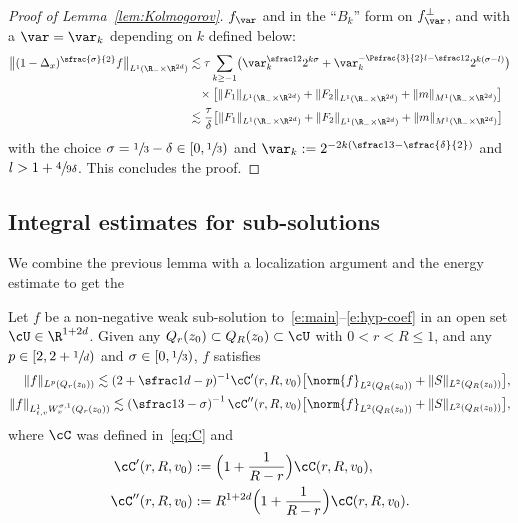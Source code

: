 \begin{proof}[Proof of Lemma~\ref{lem:Kolmogorov}]
$f_\var$ and in the ``$B_k$'' form on $f_\var^\bot$, and with
a $\var=\var_k$ depending on $k$ defined below:
\begin{align*}
\bigl\| (1-\Delta_x)^{\sfrac{\sigma}{2}} f \bigr\|_{L^1(\R_-
\times \R^{2d})}
& \lesssim \tau \sum_{k \ge -1} \bigl( \var_k
^{\sfrac12} 2^{k\sigma} + \var_k^{-\Psfrac{3}{2}l -\sfrac12}
2^{k(\sigma-l)} \bigr) \\
&\hspace*{3mm}
\times \bigl[ \| F_1 \|_{L^1(\R_- \times \R^{2d})}
+ \left\| F_2 \right\|_{L^1(\R_- \times \R^{2d})}
+ \| m \|_{M^1(\R_- \times \R^{2d})} \bigr]\\
& \lesssim
\frac{\tau}{\delta} \bigl[ \| F_1 \|_{L^1(\R_- \times \R^{2d})}
+ \left\| F_2 \right\|_{L^1(\R_- \times \R^{2d})}
+ \| m \|_{M^1(\R_- \times \R^{2d})} \bigr]
\end{align*}
with the choice $\sigma = \sfrac13 - \delta \in [0,\sfrac13)$ and
$\var_k := 2^{-2k(\sfrac13-\sfrac{\delta}{2})}$ and
$l> 1+\sfrac{4}{9\delta}$. This concludes the proof.
\Changelback
\end{proof}

\subsection{Integral estimates for sub-solutions}

We combine the previous lemma with a localization argument and
the energy estimate to get the
\begin{proposition}
\label{prop:Gain sol}
Let $f$ be a non-negative weak sub-solution
to~\eqref{e:main}--\eqref{e:hyp-coef} in an open set
$\cU \in \R^{1+2d}$. Given any
$Q_r(z_0) \subset Q_R(z_0) \subset \cU$ with $0<r<R \le 1$, and
any $p \in [2,2+\sfrac1d)$ and $\sigma \in [0,\sfrac13)$, $f$
satisfies
\begin{align}
\label{eq:gain-int}
\|f\|_{L^{p}(Q_r(z_0))} \lesssim ( 2+ \sfrac1d - p)^{-1}
\cC'(r,R,v_0) \bigl[ \norm{f}_{L^{2}(Q_R(z_0))}
+ \|S\|_{L^2(Q_R(z_0))} \bigr] ,\\
\label{eq:gain-reg}
\| f \|_{L^1_{t,v}W^{\sigma,1}_x(Q_r(z_0))} \lesssim \left(
\sfrac13 - \sigma \right)^{-1}
\cC''(r,R,v_0) \bigl[ \norm{f}_{L^{2}(Q_R(z_0))}
+ \|S\|_{L^2(Q_R(z_0))} \bigr],
\end{align}
where $\cC$ was defined in~\eqref{eq:C} and
\begin{align*}
\cC'(r,R,v_0) &:= \Bigl( 1+ \frac{1}{R-r} \Bigr)
\cC(r,R,v_0),\\
\cC''(r,R,v_0) &:= R^{1+2d} \Bigl( 1+ \frac{1}{R-r} \Bigr)
\cC(r,R,v_0).
\end{align*}
\end{proposition}

